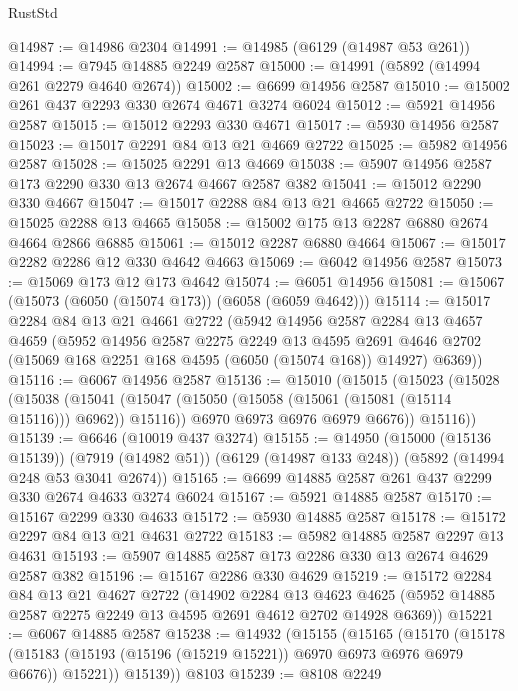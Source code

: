 \begin{lexlean}{RustStd}
\begin{coremodule}
@14987 := @14986 @2304
@14991 := @14985 (@6129 (@14987 @53 @261))
@14994 := @7945 @14885 @2249 @2587
@15000 := @14991 (@5892 (@14994 @261 @2279 @4640 @2674))
@15002 := @6699 @14956 @2587
@15010 := @15002 @261 @437 @2293 @330 @2674 @4671 @3274 @6024
@15012 := @5921 @14956 @2587
@15015 := @15012 @2293 @330 @4671
@15017 := @5930 @14956 @2587
@15023 := @15017 @2291 @84 @13 @21 @4669 @2722
@15025 := @5982 @14956 @2587
@15028 := @15025 @2291 @13 @4669
@15038 := @5907 @14956 @2587 @173 @2290 @330 @13 @2674 @4667 @2587 @382
@15041 := @15012 @2290 @330 @4667
@15047 := @15017 @2288 @84 @13 @21 @4665 @2722
@15050 := @15025 @2288 @13 @4665
@15058 := @15002 @175 @13 @2287 @6880 @2674 @4664 @2866 @6885
@15061 := @15012 @2287 @6880 @4664
@15067 := @15017 @2282 @2286 @12 @330 @4642 @4663
@15069 := @6042 @14956 @2587
@15073 := @15069 @173 @12 @173 @4642
@15074 := @6051 @14956
@15081 := @15067 (@15073 (@6050 (@15074 @173)) (@6058 (@6059 @4642)))
@15114 := @15017
    @2284
    @84
    @13
    @21
    @4661
    @2722
    (@5942
      @14956
      @2587
      @2284
      @13
      @4657
      @4659
      (@5952
        @14956
        @2587
        @2275
        @2249
        @13
        @4595
        @2691
        @4646
        @2702
        (@15069 @168 @2251 @168 @4595 (@6050 (@15074 @168)) @14927)
        @6369))
@15116 := @6067 @14956 @2587
@15136 := @15010
    (@15015
      (@15023
        (@15028
          (@15038
            (@15041 (@15047 (@15050 (@15058 (@15061 (@15081 (@15114 @15116))) @6962)) @15116))
            @6970
            @6973
            @6976
            @6979
            @6676))
        @15116))
@15139 := @6646 (@10019 @437 @3274)
@15155 := @14950
    (@15000 (@15136 @15139))
    (@7919 (@14982 @51))
    (@6129 (@14987 @133 @248))
    (@5892 (@14994 @248 @53 @3041 @2674))
@15165 := @6699 @14885 @2587 @261 @437 @2299 @330 @2674 @4633 @3274 @6024
@15167 := @5921 @14885 @2587
@15170 := @15167 @2299 @330 @4633
@15172 := @5930 @14885 @2587
@15178 := @15172 @2297 @84 @13 @21 @4631 @2722
@15183 := @5982 @14885 @2587 @2297 @13 @4631
@15193 := @5907 @14885 @2587 @173 @2286 @330 @13 @2674 @4629 @2587 @382
@15196 := @15167 @2286 @330 @4629
@15219 := @15172
    @2284
    @84
    @13
    @21
    @4627
    @2722
    (@14902
      @2284
      @13
      @4623
      @4625
      (@5952 @14885 @2587 @2275 @2249 @13 @4595 @2691 @4612 @2702 @14928 @6369))
@15221 := @6067 @14885 @2587
@15238 := @14932
    (@15155
      (@15165
        (@15170
          (@15178 (@15183 (@15193 (@15196 (@15219 @15221)) @6970 @6973 @6976 @6979 @6676)) @15221))
        @15139))
    @8103
@15239 := @8108 @2249

\end{coremodule}
\end{lexlean}
